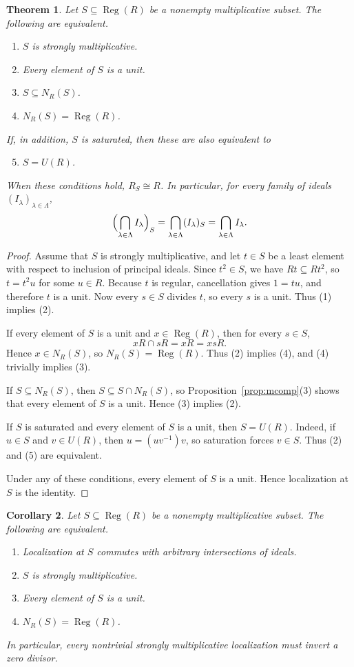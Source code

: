 \documentclass[11pt]{amsart}
\newtheorem{theorem}{Theorem}[section]
\newtheorem{corollary}[theorem]{Corollary}
\theoremstyle{definition}
\theoremstyle{remark}
\newcommand{\Reg}{\operatorname{Reg}}
\begin{document}
\begin{theorem}\label{thm:mcomp}
Let $S \subseteq \Reg(R)$ be a nonempty multiplicative subset.
The following are equivalent.
\begin{enumerate}
\item $S$ is strongly multiplicative.
\item Every element of $S$ is a unit.
\item $S \subseteq N_R(S)$.
\item $N_R(S)=\Reg(R)$.
\end{enumerate}
If, in addition, $S$ is saturated, then these are also equivalent to
\begin{enumerate}
\setcounter{enumi}{4}
\item $S=U(R)$.
\end{enumerate}
When these conditions hold, $R_S \cong R$.
In particular, for every family of ideals $(I_\lambda)_{\lambda \in \Lambda}$,
\[
\Bigl(\bigcap_{\lambda \in \Lambda} I_\lambda\Bigr)_S
=
\bigcap_{\lambda \in \Lambda} (I_\lambda)_S
=
\bigcap_{\lambda \in \Lambda} I_\lambda.
\]
\end{theorem}

\begin{proof}
Assume that $S$ is strongly multiplicative, and let $t \in S$ be a least element with respect to inclusion of principal ideals.
Since $t^2 \in S$, we have $Rt\subseteq Rt^2$, so $t=t^2u$ for some $u \in R$.
Because $t$ is regular, cancellation gives $1=tu$, and therefore $t$ is a unit.
Now every $s \in S$ divides $t$, so every $s$ is a unit.
Thus (1) implies (2).

If every element of $S$ is a unit and $x \in \Reg(R)$, then for every $s \in S$,
\[
xR \cap sR=xR=xsR.
\]
Hence $x \in N_R(S)$, so $N_R(S)=\Reg(R)$.
Thus (2) implies (4), and (4) trivially implies (3).

If $S \subseteq N_R(S)$, then $S \subseteq S \cap N_R(S)$, so Proposition~\ref{prop:mcomp}(3) shows that every element of $S$ is a unit.
Hence (3) implies (2).

If $S$ is saturated and every element of $S$ is a unit, then $S=U(R)$.
Indeed, if $u \in S$ and $v \in U(R)$, then $u=(uv^{-1})v$, so saturation forces $v \in S$.
Thus (2) and (5) are equivalent.

Under any of these conditions, every element of $S$ is a unit.
Hence localization at $S$ is the identity.
\end{proof}

\begin{corollary}\label{cor:mcomp}
Let $S \subseteq \Reg(R)$ be a nonempty multiplicative subset.
The following are equivalent.
\begin{enumerate}
\item Localization at $S$ commutes with arbitrary intersections of ideals.
\item $S$ is strongly multiplicative.
\item Every element of $S$ is a unit.
\item $N_R(S)=\Reg(R)$.
\end{enumerate}
In particular, every nontrivial strongly multiplicative localization must invert a zero divisor.
\end{corollary}
\end{document}
